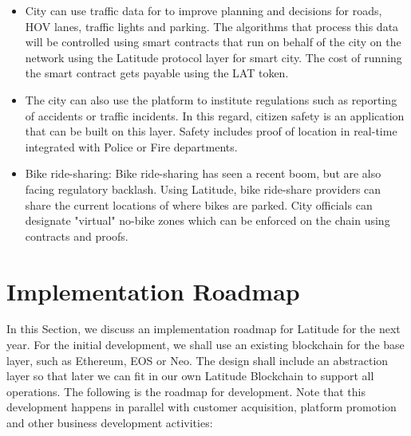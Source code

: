 \begin{itemize}
    \item City can use traffic data for to improve planning and decisions for roads, HOV lanes, traffic lights and
        parking. The algorithms that process this data will be controlled using smart contracts that run on behalf of
        the city on the network using the Latitude protocol layer for smart city. The cost of running the smart contract
        gets payable using the LAT token.
    \item The city can also use the platform to institute regulations such as reporting of accidents or traffic
        incidents. In this regard, citizen safety is an application that can be built on this layer. Safety includes
        proof of location in real-time integrated with Police or Fire departments.
    \item Bike ride-sharing: Bike ride-sharing has seen a recent boom, but are also facing regulatory backlash. Using
        Latitude, bike ride-share providers can share the current locations of where bikes are parked. City officials
        can designate "virtual" no-bike zones which can be enforced on the chain using contracts and proofs. 
\end{itemize}

%

\section{Implementation Roadmap}
\label{sec:roadmap}

In this Section, we discuss an implementation roadmap for Latitude for the next year. For the initial development, we
shall use an existing blockchain for the base layer, such as Ethereum, EOS or Neo. The design shall include an
abstraction layer so that later we can fit in our own Latitude Blockchain to support all operations. The following is
the roadmap for development. Note that this development happens in parallel with customer acquisition, platform
promotion and other business development activities:

